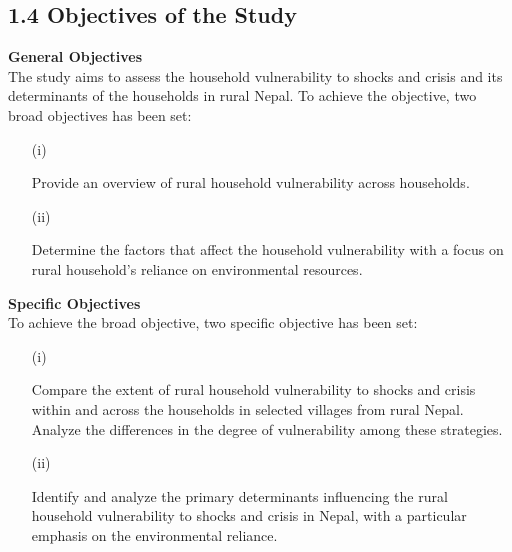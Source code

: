 \subsection*{1.4 Objectives of the Study }
\renewcommand{\thepage}{\arabic{page}}
\textbf{General Objectives}
\\
The study aims to assess the household vulnerability to shocks and crisis and its determinants of the households in rural Nepal. To achieve the objective, two broad objectives has been set:
\begin{enumerate}
	\item[(i)] \parbox[t]{\linewidth}{Provide an overview of rural household vulnerability across households.}
	\item [(ii)] \parbox[t]{\linewidth}{Determine the factors that affect the household vulnerability with a focus on rural household's reliance on environmental resources.}
\end{enumerate}
\vspace{1cm}

\textbf{Specific Objectives} 
\\
To achieve the broad objective, two specific objective has been set:
\begin{enumerate}
	\item[(i)] \parbox[t]{\linewidth}{Compare the extent of rural household vulnerability to shocks and crisis within and across the households in selected villages from rural Nepal. Analyze the differences in the degree of vulnerability among these strategies.}
	
	\item[(ii)] \parbox[t]{\linewidth}{Identify and analyze the primary determinants influencing the rural household vulnerability to shocks and crisis in Nepal, with a particular emphasis on the environmental reliance.} 
\end{enumerate}  \\ \vspace{0.5cm}

